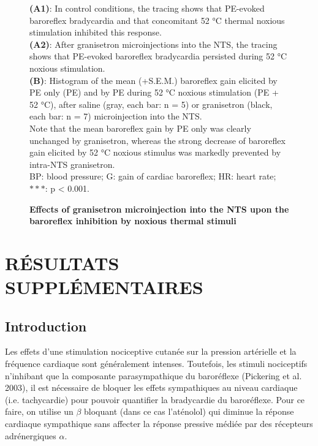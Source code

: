 \documentclass[a4paper,12pt,twoside]{report}
\begin{document}
\begin{figure}[p]
\caption[Effects of intra-NTS granisetron microinjection on the baroreflex inhibition]{\textbf{Effects of granisetron microinjection into the NTS upon the baroreflex inhibition by noxious thermal stimuli}}

{\protect\parbox[t]{18cm}{
\begin{small}
\textbf{(A1)}: In control conditions, the tracing shows that PE-evoked baroreflex bradycardia and that concomitant 52 °C thermal noxious stimulation inhibited this response.\\ 
\textbf{(A2)}: After granisetron microinjections into the NTS, the tracing shows that PE-evoked baroreflex bradycardia persisted during 52 °C noxious stimulation.\\ 
\textbf{(B)}: Histogram of the mean (+S.E.M.) baroreflex gain elicited by PE only (PE) and by PE during 52 °C noxious stimulation (PE + 52 °C), after saline (gray, each bar: n = 5) or granisetron (black, each bar: n = 7) microinjection into the NTS.\\ 
Note that the mean baroreflex gain by PE only was clearly unchanged by granisetron, whereas the strong decrease of baroreflex gain elicited by 52 °C noxious stimulus was markedly prevented by intra-NTS granisetron.\\ 
BP: blood pressure; G: gain of cardiac baroreflex; HR: heart rate; $***$: p < 0.001.
\end{small}}}

\label{Article2-FIG7}

\end{figure}

\cleardoublepage

\section{RÉSULTATS SUPPLÉMENTAIRES}

\subsection{Introduction}

Les effets d’une stimulation nociceptive cutanée sur la pression artérielle et la fréquence cardiaque sont généralement intenses. Toutefois, les stimuli nociceptifs n’inhibant que la composante parasympathique du baroréflexe (Pickering et al. 2003), il est nécessaire de bloquer les effets sympathiques au niveau cardiaque (i.e. tachycardie) pour pouvoir quantifier la bradycardie du baroréflexe. Pour ce faire, on utilise un $\beta$ bloquant (dans ce cas l’aténolol) qui diminue la réponse cardiaque sympathique sans affecter la réponse pressive médiée par des récepteurs adrénergiques $\alpha$.
\end{document}
